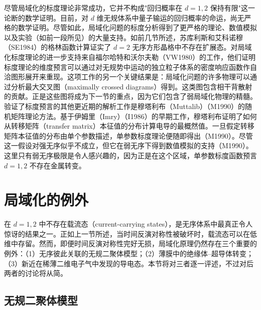 尽管局域化的标度理论非常成功，它并不构成"回归概率在 $d=1,2$ 保持有限"这一论断的数学证明。目前，对 $d$ 维无规体系中量子输运的回归概率的命运，尚无严格的数学证明。尽管如此，局域化问题的标度分析得到了更严格的理论、数值模拟以及实验（如前一段所见）的大量支持。如前几节所述，苏库利斯和艾科诺穆（SE1984）的格林函数计算证实了 $d=2$ 无序方形晶格中不存在扩展态。对局域化标度理论的进一步支持来自福尔哈特和沃尔夫勒（VW1980）的工作，他们证明标度理论的维度预言可以通过对无规势中运动的独立粒子体系的密度响应函数作自洽图形展开来重现。这项工作的另一个关键结果是：局域化问题的许多物理可以通过分析最大交叉图（maximally crossed diagrams）得到。这类图包含相干背散射的贡献。正是这些图将成为下一节的重点，因为它们包含了弱局域化物理的精髓。验证了标度预言的其他更近期的解析工作是穆塔利布（Muttalib）（M1990）的随机矩阵理论方法。基于伊姆里（Imry）（I1986）的早期工作，穆塔利布证明了如何从转移矩阵（transfer matrix）本征值的分布计算电导的最概然值。一旦假定转移矩阵本征值的分布由单个参数描述，单参数标度理论便随即得出（M1990）。尽管这一假设对强无序似乎不成立，但它在弱无序下得到数值模拟的支持（M1990）。这里只有弱无序极限是令人感兴趣的，因为正是在这个区域，单参数标度函数预言 $d=1,2$ 不存在金属转变。

\section{局域化的例外}

在 $d=1,2$ 中不存在载流态（current-carrying states），是无序体系中最真正令人惊讶的结果之一。正如上一节所述，当时间反演对称性被破坏时，载流态可以在低维中存留。然而，即便时间反演对称性完好无损，局域化原理仍然存在三个重要的例外：（1）无序彼此关联的无规二聚体模型；（2）薄膜中的绝缘体--超导体转变；（3）新近在稀薄二维电子气中发现的导电态。本节将对三者逐一评述，不过对后两者的讨论将从简。

\subsection{无规二聚体模型}

